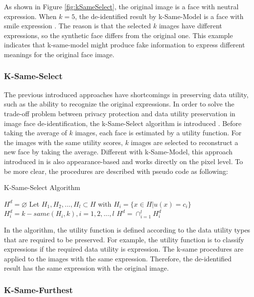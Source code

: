   	As shown in Figure \ref{fig:kSameSelect}, the original image is a face with
  	neutral expression. When $k=5$, the de-identified result by k-Same-Model is
  	a face with smile expression \cite{faceDeId09}. The reason is that the selected
  	$k$ images have different expressions, so the synthetic face differs from the
  	original one. This example indicates that k-same-model
  	might produce fake information to express different meanings for the original
  	face image.

	\subsubsection{K-Same-Select}

	The previous introduced approaches have shortcomings in preserving data utility,
	such as the ability to recognize the original expressions. 
	In order to solve the trade-off problem between privacy protection and data
	utility preservation in image face de-identification, the k-Same-Select algorithm
	is introduced \cite{Ralph05}. Before taking the average of $k$ images, each face
	is estimated by a utility function. For the images with the same utility scores,
	$k$ images are selected to reconstruct a new face by taking the average. Different
	with k-Same-Model, this approach introduced in \cite{Ralph05} is also 
	appearance-based and works directly on the pixel level. To be more clear, the 
	procedures are described with pseudo code as following:

	\begin{algorithm}[H]  
	\caption{K-Same-Select Algorithm}  
		$H^d = \varnothing$\;
		Let $H_1,H_2,...,H_l \subset H$ with $H_i = \{x\in H|u(x)=c_i\}$\;
		$H^{d}_{i} = k-same(H_i,k),i=1,2,...,l$\;
		$H^d = \cap_{i=1}^{l}H^{d}_{i}$\;
	\end{algorithm}

	In the algorithm, the utility function is defined according to
	the data utility types that are required to be preserved. For
	example, the utility function is to classify expressions if the 
	required data utility is expression. The k-same procedures are 
	applied to the images with the same expression. Therefore, the
	de-identified result has the same expression with the original
	image.

	\subsubsection{K-Same-Furthest}

